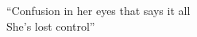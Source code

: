 \thispagestyle{empty}


\vspace*{0.2\textheight}

\begin{flushright}
    \itshape

    ``Confusion in her eyes that says it all\\
    She's lost control''

\end{flushright}

\vfill